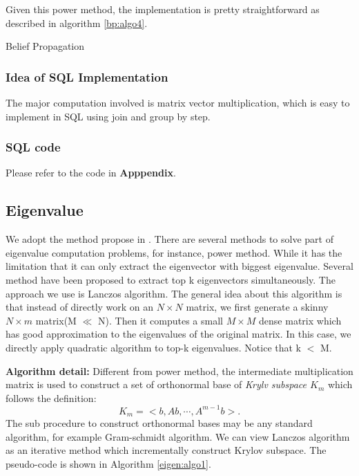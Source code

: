 Given this power method, the implementation is pretty straightforward as described in algorithm \ref{bp:algo4}.
\begin{algorithm}
\caption{Belief Propagation}
\begin{algorithmic}
\REPEAT
{}
\end{algorithmic}
\label{bp:algo4}
\end{algorithm}

\subsubsection{Idea of SQL Implementation}
The major computation involved is matrix vector multiplication, which is easy to implement in SQL using join and group by step.

\subsubsection{SQL code}
Please refer to the code in {\bf Apppendix}.

\subsection{Eigenvalue}
We adopt the method propose in \cite{kang2011spectral}. There are several methods to solve part of eigenvalue computation problems, for instance, power method\cite{langville2004deeper}. While it has the limitation that it can only extract the eigenvector with biggest eigenvalue. Several method have been proposed to extract top k eigenvectors simultaneously. The approach we use is Lanczos algorithm\cite{lanczos1950iteration}. The general idea about this algorithm is that instead of directly work on an $N \times N$ matrix, we first generate a skinny $N \times m$ matrix(M $\ll$ N). Then it computes a small $M \times M$ dense matrix which has good approximation to the eigenvalues of the original matrix. In this case, we directly apply quadratic algorithm to top-k eigenvalues. Notice that k $<$ M.

{\bf{Algorithm detail:}} Different from power method, the intermediate multiplication matrix is used to construct a set of orthonormal base of \emph{Krylv subspace $K_{m}$} which follows the definition:
\begin{equation}
K_{m} = < b, Ab, \cdots, A^{m-1}b>.
\end{equation}
The sub procedure to construct orthonormal bases may be any standard algorithm, for example Gram-schmidt algorithm. We can view Lanczos algorithm as an iterative method which incrementally construct Krylov subspace. The pseudo-code is shown in Algorithm \ref{eigen:algo1}.

